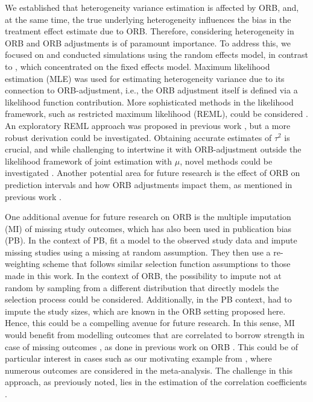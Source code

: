 \documentclass[twocolumn]{article}\usepackage[]{graphicx}\usepackage[]{xcolor}
\providecommand{\DIFaddtex}[1]{{\protect\color{blue}\uwave{#1}}} %
\providecommand{\DIFaddbegin}{} %
\providecommand{\DIFaddend}{} %
\providecommand{\DIFadd}[1]{\texorpdfstring{\DIFaddtex{#1}}{#1}} %
\newcommand{\DIFaddincludegraphics}[2][]{{\color{blue}\fbox{\DIFOincludegraphics[#1]{#2}}}} %
\DeclareRobustCommand{\DIFaddbegin}{\DIFOaddbegin \let\includegraphics\DIFaddincludegraphics} %
\DeclareRobustCommand{\DIFaddend}{\DIFOaddend \let\includegraphics\DIFOincludegraphics} %
\begin{document}
We established that heterogeneity variance estimation is affected by ORB, and, at the same time, the true underlying heterogeneity influences the bias in the treatment effect estimate due to ORB. Therefore, considering heterogeneity in ORB and ORB adjustments is of paramount importance. To address this, we focused on and conducted simulations using the random effects model, in contrast to \citet{Copas2019}, which concentrated on the fixed effects model. Maximum likelihood estimation (MLE) was used for estimating heterogeneity variance due to its connection to ORB-adjustment, i.e.,  the ORB adjustment itself is defined via a likelihood function contribution. More sophisticated methods in the likelihood framework, such as restricted maximum likelihood (REML), could be considered \citep{REML, tauCI, REML2, mythesis}. An exploratory REML approach was proposed in previous work \citep{mythesis}, but a more robust derivation could be investigated. Obtaining accurate estimates of $\tau^2$ is crucial, and while challenging to intertwine it with ORB-adjustment outside the likelihood framework of joint estimation with $\mu$, novel methods could be investigated \citep{tauCI, REML, REML2}. Another potential area for future research is the effect of ORB on prediction intervals \citep{PI_coverage} and how ORB adjustments impact them, as mentioned in previous work \citep{mythesis}.

One additional avenue for future research on ORB is the multiple imputation (MI) of missing study outcomes, which has also been used in publication bias (PB). In the context of PB, \citet{MI_PB_Carpenter2011} fit a model to the observed study data and impute missing studies using a missing at random \DIFaddbegin \DIFadd{(MAR) }\DIFaddend assumption. They then use a re-weighting scheme that follows similar selection function assumptions to those made in this work. In the context of ORB, the possibility to impute not at random by sampling from a different distribution that directly models the selection process could be considered. Additionally, in the PB context, \citet{MI_PB_Carpenter2011} had to impute the study sizes,  which are known in the ORB setting proposed here. Hence, this could be a compelling avenue for future research. In this sense, MI would benefit from modelling outcomes that are correlated to borrow strength in case of missing outcomes \citep{MI_PB_Carpenter2011}, as done in previous work on ORB \citep{Bay, Kirkham2012}. This could be of particular interest in cases such as our motivating example from \citet{Copas2019, topiramate}, where numerous outcomes are considered in the meta-analysis. The challenge in this approach, as previously noted, lies in the estimation of the correlation coefficients \citep{mythesis, Bay, Kirkham2012}.
\end{document}
